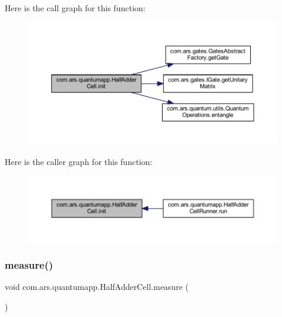 Here is the call graph for this function\+:\nopagebreak
\begin{figure}[H]
\begin{center}
\leavevmode
\includegraphics[width=350pt]{classcom_1_1ars_1_1quantumapp_1_1_half_adder_cell_a077ff8604fb9f4b2043ab4264327f4b4_cgraph}
\end{center}
\end{figure}
Here is the caller graph for this function\+:\nopagebreak
\begin{figure}[H]
\begin{center}
\leavevmode
\includegraphics[width=350pt]{classcom_1_1ars_1_1quantumapp_1_1_half_adder_cell_a077ff8604fb9f4b2043ab4264327f4b4_icgraph}
\end{center}
\end{figure}
\hypertarget{classcom_1_1ars_1_1quantumapp_1_1_half_adder_cell_a534b92e8e8fd9cbc2538a4e86311b3aa}{}\label{classcom_1_1ars_1_1quantumapp_1_1_half_adder_cell_a534b92e8e8fd9cbc2538a4e86311b3aa} 
\subsubsection{\texorpdfstring{measure()}{measure()}}
{\footnotesize\ttfamily void com.\+ars.\+quantumapp.\+Half\+Adder\+Cell.\+measure (\begin{DoxyParamCaption}{ }\end{DoxyParamCaption})}


